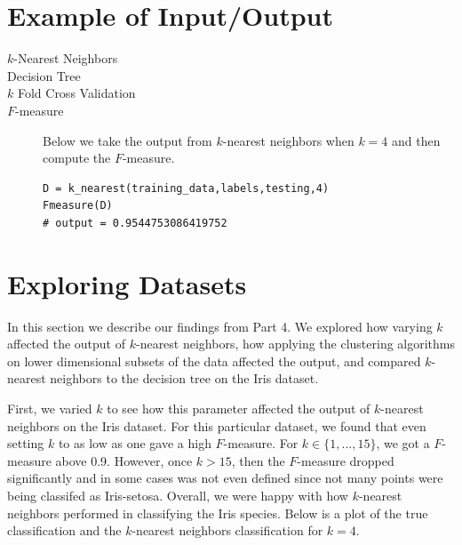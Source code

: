 \documentclass[psamsfonts,onesided,10pt]{amsart}
\begin{document}
\section{Example of Input/Output}
\begin{description}
\item[$k$-Nearest Neighbors] \todo{}

\item[Decision Tree] \todo{}

\item[$k$ Fold Cross Validation] \todo{}

\item[$F$-measure] Below we take the output from $k$-nearest neighbors when $k=4$ and then compute the $F$-measure. 
\begin{verbatim}
D = k_nearest(training_data,labels,testing,4)
Fmeasure(D)
# output = 0.9544753086419752
\end{verbatim}
\end{description}

\section{Exploring Datasets}
In this section we describe our findings from Part 4. We explored how varying $k$ affected the 
output of $k$-nearest neighbors, how applying the clustering algorithms on lower dimensional 
subsets of the data affected the output, and compared $k$-nearest neighbors to the decision 
tree on the Iris dataset. 

First, we varied $k$ to see how this parameter affected the output of $k$-nearest neighbors on 
the Iris dataset. For this particular dataset, we found that even setting $k$ to as low as one gave 
a high $F$-measure. For $k\in \{1,...,15\}$, we got a $F$-measure above 0.9. However, 
once $k>15$, then the $F$-measure dropped significantly and in some cases was not even 
defined since not many points were being classifed as Iris-setosa. Overall, we were happy with 
how $k$-nearest neighbors performed in classifying the Iris species. Below is a plot of the true 
classification and the $k$-nearest neighbors classification for $k=4$. 
\end{document}
